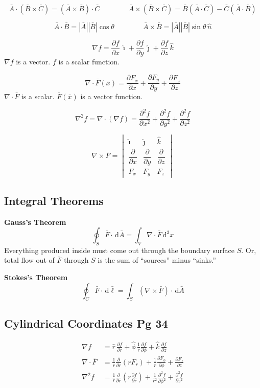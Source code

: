 \documentclass[11pt]{article}
\newcommand{\ih}{\hat{\imath}}
\newcommand{\jh}{\hat{\jmath}}
\newcommand{\kh}{\hat{k}}
\newcommand{\dd}{\,\mathrm{d}}
\begin{document}
\[
  \bar{A}\cdot(\bar{B}\times\bar{C}) = (\bar{A}\times\bar{B})\cdot\bar{C}
  \qquad\qquad
  \bar{A}\times(\bar{B}\times\bar{C}) = \bar{B}(\bar{A}\cdot\bar{C}) - \bar{C}(\bar{A}\cdot\bar{B})
\]

\[
  \bar{A}\cdot\bar{B} = |\bar{A}||\bar{B}|\cos\theta
  \qquad\qquad
  \bar{A}\times\bar{B} = |\bar{A}||\bar{B}|\sin\theta\,\hat{n}
\]

\[
  \nabla f = \frac{\partial f}{\partial x}\,\ih + \frac{\partial f}{\partial y}\,\jh + \frac{\partial f}{\partial z}\,\kh
\]
$\nabla f$ is a vector. $f$ is a scalar function.

\[
  \nabla\cdot\bar{F}(\bar{x}) = \frac{\partial F_x}{\partial x} + \frac{\partial F_y}{\partial y} + \frac{\partial F_z}{\partial z}
\]
$\nabla\cdot\bar{F}$ is a scalar. $\bar{F}(\bar{x})$ is a vector function.

\[
  \nabla^2 f = \nabla\cdot(\nabla f) = \frac{\partial^2 f}{\partial x^2} + \frac{\partial^2 f}{\partial y^2} + \frac{\partial^2 f}{\partial z^2}
\]

\[
  \nabla\times\bar{F} =
  \begin{vmatrix}
    \ih & \jh & \kh\\
    \dfrac{\partial}{\partial x} & \dfrac{\partial}{\partial y} & \dfrac{\partial}{\partial z}\\[1ex]
    F_x & F_y & F_z
  \end{vmatrix}
\]

\subsection{Integral Theorems}

\textbf{Gauss's Theorem}
\[
  \oint_S \bar{F}\cdot\dd\bar{A} = \int_V \nabla\cdot\bar{F}\dd^3x
\]
Everything produced inside must come out through the boundary surface $S$. Or, total flow out of $\bar{F}$ through $S$ is the sum of ``sources'' minus ``sinks.''

\textbf{Stokes's Theorem}
\[
  \oint_C \bar{F}\cdot\dd\bar{\ell} = \int_S (\nabla\times\bar{F})\cdot\dd\bar{A}
\]

\subsection{Cylindrical Coordinates \hfill \normalfont\normalsize Pg 34}

\begin{align*}
  \nabla f &= \hat{r}\,\frac{\partial f}{\partial r} + \hat{\phi}\,\frac{1}{r}\frac{\partial f}{\partial \phi} + \kh\,\frac{\partial f}{\partial z}\\[1ex]
  \nabla\cdot\bar{F} &= \frac{1}{r}\frac{\partial}{\partial r}(rF_r) + \frac{1}{r}\frac{\partial F_\phi}{\partial \phi} + \frac{\partial F_z}{\partial z}\\[1ex]
  \nabla^2 f &= \frac{1}{r}\frac{\partial}{\partial r}\!\left(r\frac{\partial f}{\partial r}\right) + \frac{1}{r^2}\frac{\partial^2 f}{\partial \phi^2} + \frac{\partial^2 f}{\partial z^2}
\end{align*}
\end{document}
